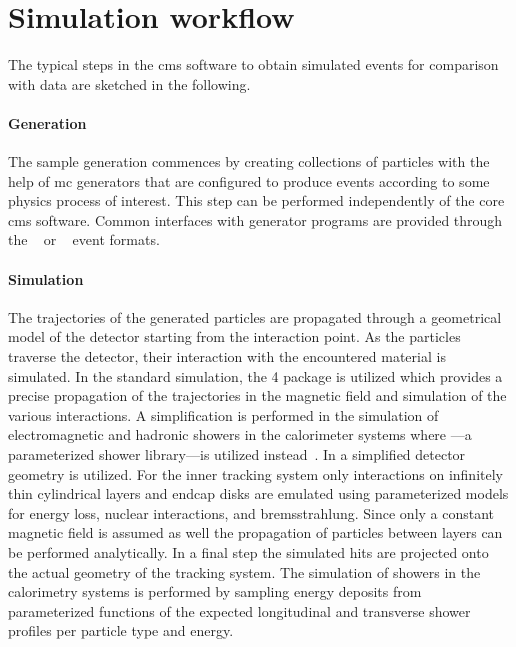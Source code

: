 \section{Simulation workflow}
\label{sec:fsim-workflow}

The typical steps in the \gls{cms} software to obtain simulated events for comparison with data are sketched in the following.

\paragraph{Generation} The sample generation commences by creating collections of particles with the help of \acrfull{mc} generators that are configured to produce events according to some physics process of interest. This step can be performed independently of the core \gls{cms} software. Common interfaces with generator programs are provided through the \HEPMC[format=hyperbf]~\cite{Dobbs:2001ck,hepmc} or \LHEF[format=hyperbf]~\cite{Alwall:2006yp} event formats.

\paragraph{Simulation} The trajectories of the generated particles are propagated through a geometrical model of the detector starting from the interaction point. As the particles traverse the detector, their interaction with the encountered material is simulated. In the standard simulation, the \GEANT{}4 package is utilized which provides a precise propagation of the trajectories in the magnetic field and simulation of the various interactions. A simplification is performed in the simulation of electromagnetic and hadronic showers in the calorimeter systems where \GFLASH---a parameterized shower library---is utilized instead~\cite{1742-6596-293-1-012023,RAHMAT2012340}. In \FSIM a simplified detector geometry is utilized. For the inner tracking system only interactions on infinitely thin cylindrical layers and endcap disks are emulated using parameterized models for energy loss, nuclear interactions, and bremsstrahlung. Since only a constant magnetic field is assumed as well the propagation of particles between layers can be performed analytically. In a final step the simulated hits are projected onto the actual geometry of the tracking system. The simulation of showers in the calorimetry systems is performed by sampling energy deposits from parameterized functions of the expected longitudinal and transverse shower profiles per particle type and energy.
